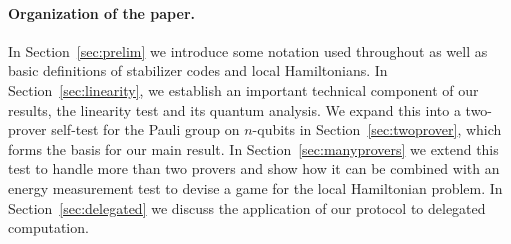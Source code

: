 \documentclass[11pt,letterpaper]{article}
\newcommand{\<}{\langle}
\renewcommand{\>}{\rangle}
\newcommand{\MIP}{\textsc{MIP}}
\newcommand{\NEXP}{\textsc{NEXP}}
\begin{document}

	
	


\paragraph{Organization of the paper.}
In Section~\ref{sec:prelim} we introduce some notation used throughout
as well as basic definitions of stabilizer codes and local
Hamiltonians. In Section~\ref{sec:linearity}, we establish an important technical component of our results, the linearity test and its quantum
analysis. We expand this into a two-prover self-test for the Pauli group on
$n$-qubits in Section~\ref{sec:twoprover}, which forms the basis for our main result. In
Section~\ref{sec:manyprovers} we extend this test to handle more than
two provers and show how it can be combined with
an energy measurement test to devise a game for the local
Hamiltonian problem. In Section~\ref{sec:delegated} we
discuss the application of our protocol to delegated computation. 
\end{document}
